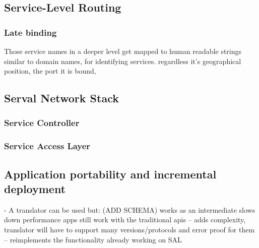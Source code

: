 \subsection{Service-Level Routing} 
\subsubsection{Late binding}


Those service names in a deeper level get mapped to 
human readable strings similar to domain names, for identifying services.
 regardless it's geographical position, the port it is bound, 


\subsection{Serval Network Stack}
\subsubsection{Service Controller}
\subsubsection{Service Access Layer}

\subsection{Application portability and incremental deployment}
- A translator can be used but: (ADD SCHEMA)
works as an intermediate
slows down performance
apps still work with the traditional apis
 -- adds complexity, translator will have to support many versions/protocols and error proof for them
 -- reimplements the functionality already working on SAL





